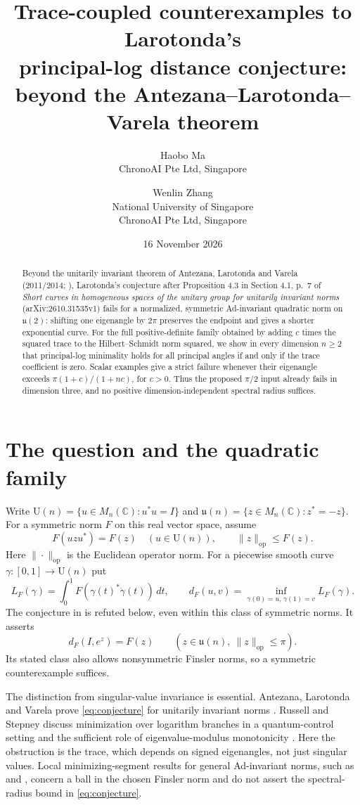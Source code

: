 \documentclass[11pt]{article}
\title{Trace-coupled counterexamples to Larotonda's\texorpdfstring{\\}{} principal-log distance conjecture:\texorpdfstring{\\}{} beyond the Antezana--Larotonda--Varela theorem}
\author{Haobo Ma\\\small ChronoAI Pte Ltd, Singapore
\and Wenlin Zhang\\\small National University of Singapore\\\small ChronoAI Pte Ltd, Singapore}
\date{16 November 2026}
\newcommand{\U}{\mathrm U}
\newcommand{\op}{\mathrm{op}}
\begin{document}
\maketitle
\begin{abstract}
Beyond the unitarily invariant theorem of Antezana, Larotonda and Varela
(2011/2014; \cite[Theorem~4.3]{ALV}), Larotonda's conjecture
after Proposition 4.3 in Section 4.1, p.~7 of
\emph{Short curves in homogeneous spaces of the unitary group for unitarily
invariant norms} (arXiv:2610.31535v1) fails for a normalized, symmetric
Ad-invariant quadratic norm on $\mathfrak u(2)$: shifting one eigenangle
by $2\pi$ preserves the endpoint and gives a shorter exponential curve.
For the full positive-definite family obtained by adding $c$ times
the squared trace to the Hilbert--Schmidt norm squared, we show in every
dimension $n\geq2$ that principal-log minimality holds for all
principal angles if and only if the trace coefficient is zero.
Scalar examples give a strict failure whenever their eigenangle exceeds
$\pi(1+c)/(1+nc)$, for $c>0$.
Thus the proposed $\pi/2$ input already fails in dimension three,
and no positive dimension-independent spectral radius suffices.
\end{abstract}

\section{The question and the quadratic family}
Write $\U(n)=\{u\in M_n(\mathbb C):u^*u=I\}$ and
$\mathfrak u(n)=\{z\in M_n(\mathbb C):z^*=-z\}$.
For a symmetric norm $F$ on this real vector space, assume
\[
 F(uzu^*)=F(z)\quad(u\in\U(n)),\qquad \|z\|_{\op}\leq F(z).
\]
Here $\|\cdot\|_{\op}$ is the Euclidean operator norm.
For a piecewise smooth curve $\gamma:[0,1]\to\U(n)$ put
\[
 L_F(\gamma)=\int_0^1F(\gamma(t)^*\dot\gamma(t))\,dt,
 \qquad d_F(u,v)=\inf_{\gamma(0)=u,\,\gamma(1)=v}L_F(\gamma).
\]
The conjecture in \cite[Section 4.1, p.~7, after Proposition 4.3]{Larotonda}
is refuted below, even within this class of symmetric norms. It asserts
\begin{equation}\label{eq:conjecture}
 d_F(I,e^z)=F(z)\qquad (z\in\mathfrak u(n),\ \|z\|_{\op}\leq\pi).
\end{equation}
Its stated class also allows nonsymmetric Finsler norms, so a symmetric
counterexample suffices.

The distinction from singular-value invariance is essential.
Antezana, Larotonda and Varela prove \eqref{eq:conjecture} for unitarily
invariant norms \cite[preprint Theorem 4.3]{ALV}.
Russell and Stepney discuss minimization over logarithm branches in a
quantum-control setting and the sufficient role of eigenvalue-modulus
monotonicity \cite[Section 4, after equation (11)]{RS}.
Here the obstruction is the trace, which depends on signed eigenangles,
not just singular values. Local minimizing-segment results for general
Ad-invariant norms, such as \cite[Theorem 4.11]{Metric} and
\cite[Corollary 2.17]{LR}, concern a ball in
the chosen Finsler norm and do not assert the spectral-radius bound
in \eqref{eq:conjecture}.
\end{document}
